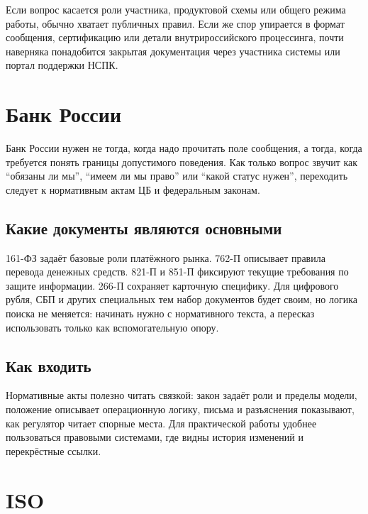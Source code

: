 Если вопрос касается роли участника, продуктовой схемы или общего
режима работы, обычно хватает публичных правил. Если же спор
упирается в формат сообщения, сертификацию или детали
внутрироссийского процессинга, почти наверняка понадобится
закрытая документация через участника системы или портал поддержки
НСПК.

\section{Банк России}
\label{sec:ps-cbr}

Банк России нужен не тогда, когда надо прочитать поле сообщения,
а тогда, когда требуется понять границы допустимого поведения.
Как только вопрос звучит как \enquote{обязаны ли мы},
\enquote{имеем ли мы право} или \enquote{какой статус нужен},
переходить следует к нормативным актам ЦБ и федеральным законам.

\subsection*{Какие документы являются основными}

161-ФЗ задаёт базовые роли платёжного рынка.
762-П описывает правила перевода денежных средств.
821-П и 851-П фиксируют текущие требования по защите
информации. 266-П сохраняет карточную специфику.
Для цифрового рубля, СБП и других специальных тем набор документов
будет своим, но логика поиска не меняется: начинать нужно
с нормативного текста, а пересказ использовать только
как вспомогательную опору.





\subsection*{Как входить}

Нормативные акты полезно читать связкой: закон задаёт роли
и пределы модели, положение описывает операционную логику,
письма и разъяснения показывают, как регулятор читает спорные
места. Для практической работы удобнее пользоваться правовыми
системами, где видны история изменений и перекрёстные ссылки.

\section{ISO}
\label{sec:ps-iso}

